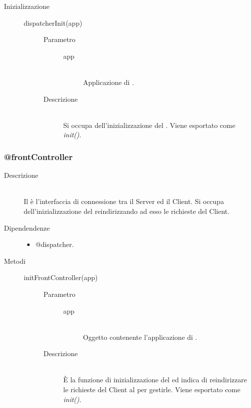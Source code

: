 \begin{description}
\begin{description}
\item[Inizializzazione] \hfill
 \begin{description}
  \item[dispatcherInit(app)] \hfill 
  \begin{description}
   \item[Parametro] \hfill 
    \begin{description}
     \item[app] \hfill \\
     Applicazione di .
    \end{description}
   \item[Descrizione] \hfill \\
   Si occupa dell'inizializzazione del . Viene esportato come \textit{init()}.
  \end{description}
 \end{description}
\end{description}
\end{description}



\subsubsection{@frontController}
\begin{description}
 \item[Descrizione] \hfill \\
 Il  è l'interfaccia di connessione tra il Server ed il Client. Si occupa dell'inizializzazione del  reindirizzando ad esso le richieste del Client.
 \item[Dipendendenze] \hfill
 \begin{itemize}
 \item @dispatcher.
 \end{itemize}
 \item[Metodi] \hfill
  \begin{description}
    \item[initFrontController(app)] \hfill 
    \begin{description}
       		\item[Parametro] \hfill
       			\begin{description}
       				\item[app] \hfill \\
       				Oggetto contenente l'applicazione di .
       			\end{description}
       		\item[Descrizione] \hfill \\
       		\`{E} la funzione di inizializzazione del  ed indica di reindirizzare le richieste del Client al  per gestirle. Viene esportato come \textit{init()}.
   \end{description}
  \end{description}
\end{description}

